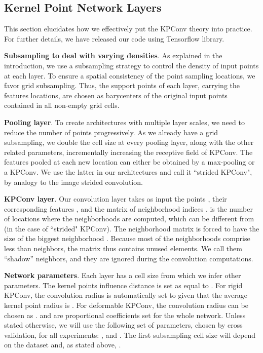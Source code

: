 \documentclass[10pt,twocolumn,letterpaper]{article}
\begin{document}
\subsection{Kernel Point Network Layers}
\label{section_33}

This section elucidates how we effectively put the KPConv theory into practice. For further details, we have released our code using Tensorflow library.

\noindent
\textbf{Subsampling to deal with varying densities}. As explained in the introduction, we use a subsampling strategy to control the density of input points at each layer. To ensure a spatial consistency of the point sampling locations, we favor grid subsampling. Thus, the support points of each layer, carrying the features locations, are chosen as barycenters of the original input points contained in all non-empty grid cells. 

\noindent
\textbf{Pooling layer}. To create architectures with multiple layer scales, we need to reduce the number of points progressively. As we already have a grid subsampling, we double the cell size at every pooling layer, along with the other related parameters, incrementally increasing the receptive field of KPConv. The features pooled at each new location can either be obtained by a max-pooling or a KPConv. We use the latter in our architectures and call it ``strided KPConv", by analogy to the image strided convolution.

\noindent
\textbf{KPConv layer}. Our convolution layer takes as input the points , their corresponding features , and the matrix of neighborhood indices .  is the number of locations where the neighborhoods are computed, which can be different from  (in the case of ``strided" KPConv). The neighborhood matrix is forced to have the size of the biggest neighborhood . Because most of the neighborhoods comprise less than  neighbors, the matrix  thus contains unused elements. We call them “shadow” neighbors, and they are ignored during the convolution computations.

\noindent
\textbf{Network parameters}. Each layer  has a cell size  from which we infer other parameters. The kernel points influence distance is set as equal to . For rigid KPConv, the convolution radius is automatically set to  given that the average kernel point radius is . For deformable KPConv, the convolution radius can be chosen as .  and  are proportional coefficients set for the whole network. Unless stated otherwise, we will use the following set of parameters, chosen by cross validation, for all experiments: ,  and . The first subsampling cell size  will depend on the dataset and, as stated above, .
\end{document}
